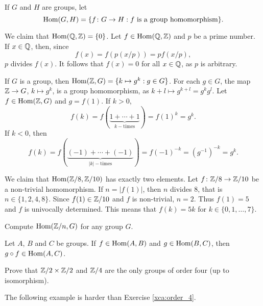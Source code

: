 If $G$ and $H$ are groups, let 
\[
\operatorname{Hom}(G,H)=\{f\colon G\to H:f\text{ is a group homomorphism}\}.
\]

\begin{example}
We claim that 
$\operatorname{Hom}(\mathbb{Q},\mathbb{Z})=\{0\}$. Let $f\in\operatorname{Hom}(\mathbb{Q},\mathbb{Z})$ and $p$ be a prime number. 
If $x\in\mathbb{Q}$, then, since 
\[
f(x)=f\left(p(x/p)\right)=pf(x/p),
\]
$p$ divides $f(x)$. It follows that $f(x)=0$ for all
$x\in\mathbb{Q}$, as $p$ is arbitrary. 
\end{example}

\begin{example}
If $G$ is a group, then $\operatorname{Hom}(\mathbb{Z},G)=\{k\mapsto g^k:g\in G\}$.
For each $g\in G$, the map $\mathbb{Z}\to G$, $k\mapsto g^k$, is a group
homomorphism, as 
$k+l\mapsto g^{k+l}=g^kg^l$. Let $f\in\operatorname{Hom}(\mathbb{Z},G)$ and  $g=f(1)$. If $k>0$,
\[
f(k)=f(\underbrace{1+\cdots+1}_{k-\text{times}})=f(1)^k=g^k.
\]
If $k<0$, then
\[
f(k)=f(\underbrace{(-1)+\cdots+(-1)}_{|k|-\text{times}})=f(-1)^{-k}=(g^{-1})^{-k}=g^k.
\]
\end{example}

\begin{example}
We claim that $\operatorname{Hom}(\mathbb{Z}/8,\mathbb{Z}/10)$ has exactly two elements.
Let $f\colon\mathbb{Z}/8\to\mathbb{Z}/10$ be a non-trivial homomorphism. If 
$n=|f(1)|$, then 
$n$ divides $8$, that is $n\in\{1,2,4,8\}$. Since $f(1)\in\mathbb{Z}/10$ and
$f$ is non-trivial,
$n=2$. Thus $f(1)=5$ and $f$ is univocally determined. 
This means that 
$f(k)=5k$ for $k\in\{0,1,\dots,7\}$.
\end{example}

\begin{exercise}
Compute $\operatorname{Hom}(\mathbb{Z}/n,G)$ for any group $G$.
\end{exercise}

\begin{exercise}
Let $A$, $B$ and $C$ be groups. If $f\in\operatorname{Hom}(A,B)$ and $g\in\operatorname{Hom}(B,C)$,
then $g\circ f\in\operatorname{Hom}(A,C)$.
\end{exercise}

\begin{exercise}
\label{xca:order_4}
Prove that $\mathbb{Z}/2\times\mathbb{Z}/2$ and $\mathbb{Z}/4$ are 
the only groups of order four (up to isomorphism). 
\end{exercise}

The following example is harder than
Exercise \ref{xca:order_4}.

